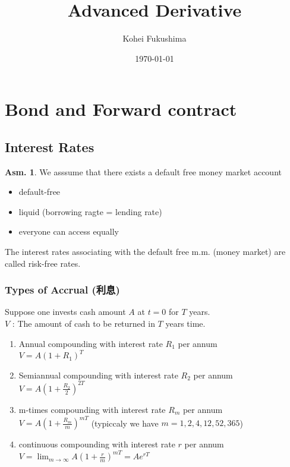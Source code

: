 \documentclass[a4paper,11pt]{jsarticle}
\title{Advanced Derivative}
\author{Kohei Fukushima}
\date{\today}
\theoremstyle{definition}
\newtheorem{asm}{Asm.}[subsection]
\begin{document}
\maketitle
\pagestyle{fancy}
\rhead{\today}


\section{Bond and Forward contract}
\subsection{Interest Rates}
\begin{asm}
  We asssume that there exists a default free
  money market account
  \begin{itemize}
    \item default-free
    \item liquid (borrowing ragte = lending rate)
    \item everyone can access equally
  \end{itemize}
\end{asm}

The interest rates associating with the default free m.m.
(money market) are called risk-free rates.


\subsubsection{Types of Accrual (利息)}
Suppose one invests cash amount $A$ at $t=0$ for $T$ years. \\
$V$ : The amount of cash to be returned in $T$ years time.

\begin{enumerate}
  \item Annual compounding with interest rate $R_1$ per annum\\
  $V=A(1+R_1)^T$
  \item Semiannual compounding with interest rate $R_2$ per annum\\
  $V=A(1+\frac{R_2}{2})^{2T}$
  \item m-times compounding with interest rate $R_m$ per annum\\
  $V=A(1+\frac{R_m}{m})^{mT}$
  \quad (typiccaly we have $m=1,2,4,12,52,365$)
  \item continuous compounding with interest rate $r$ per annum\\
  $V=\lim_{m\to\infty}A(1+\frac{r}{m})^{mT}=Ae^{rT}$  
\end{enumerate}
\end{document}
